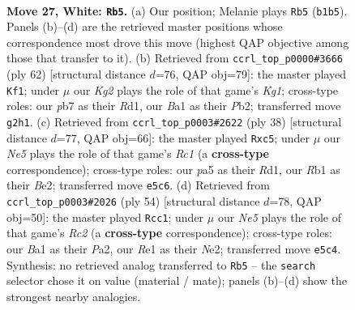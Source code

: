 \documentclass[11pt]{article}
\begin{document}
\clearpage

\begin{figure}[p]\centering
\begin{subfigure}{0.46\textwidth}\centering
\resizebox{\linewidth}{!}{%
\newchessgame
\chessboard[
  setfen={r1b3k1/1p2q2p/4r3/p1nQNpp1/8/4P1P1/P4PKP/BR2R3 w - - 2 27},
  showmover=false,
  pgfstyle=straightmove, color=movearrow, markmove={b1-b5}
]}
\caption{}
\end{subfigure}\hfill
\begin{subfigure}{0.46\textwidth}\centering
\resizebox{\linewidth}{!}{%
\newchessgame
\chessboard[
  setfen={2rr2k1/q4pp1/7p/p1b3n1/P1QN4/2B4P/1P3PP1/R2R2K1 w - - 5 32},
  showmover=false,
  pgfstyle=straightmove, color=movearrow, markmove={g1-f1}
]}
\caption{}
\end{subfigure}
\\[4pt]
\begin{subfigure}{0.46\textwidth}\centering
\resizebox{\linewidth}{!}{%
\newchessgame
\chessboard[
  setfen={r5k1/pb2qpp1/1p2p2p/2r5/3Nn3/Q3P2P/PP2BPP1/2RR2K1 w - - 3 20},
  showmover=false,
  pgfstyle=straightmove, color=movearrow, markmove={c1-c5}
]}
\caption{}
\end{subfigure}\hfill
\begin{subfigure}{0.46\textwidth}\centering
\resizebox{\linewidth}{!}{%
\newchessgame
\chessboard[
  setfen={3r2k1/2q2pp1/pn3b1p/3p4/2r5/1N1QP2P/P1R1NPP1/5RK1 w - - 13 28},
  showmover=false,
  pgfstyle=straightmove, color=movearrow, markmove={c2-c1}
]}
\caption{}
\end{subfigure}
\caption{\textbf{Move 27, White: \texttt{Rb5}.} (a) Our position; Melanie plays \texttt{Rb5} (\texttt{b1b5}). Panels (b)--(d) are the retrieved master positions whose correspondence most drove this move (highest QAP objective among those that transfer to it). (b) Retrieved from \texttt{ccrl\_top\_p0000\#3666} (ply 62) [structural distance $d$=76, QAP obj=79]: the master played \texttt{Kf1}; under $\mu$ our \emph{Kg2} plays the role of that game's \emph{Kg1}; cross-type roles: our \emph{p}b7 as their \emph{R}d1, our \emph{B}a1 as their \emph{P}b2; transferred move \texttt{g2h1}. (c) Retrieved from \texttt{ccrl\_top\_p0003\#2622} (ply 38) [structural distance $d$=77, QAP obj=66]: the master played \texttt{Rxc5}; under $\mu$ our \emph{Ne5} plays the role of that game's \emph{Rc1} (a \textbf{cross-type} correspondence); cross-type roles: our \emph{p}a5 as their \emph{R}d1, our \emph{R}b1 as their \emph{B}e2; transferred move \texttt{e5c6}. (d) Retrieved from \texttt{ccrl\_top\_p0003\#2026} (ply 54) [structural distance $d$=78, QAP obj=50]: the master played \texttt{Rcc1}; under $\mu$ our \emph{Ne5} plays the role of that game's \emph{Rc2} (a \textbf{cross-type} correspondence); cross-type roles: our \emph{B}a1 as their \emph{P}a2, our \emph{R}e1 as their \emph{N}e2; transferred move \texttt{e5c4}. Synthesis: no retrieved analog transferred to \texttt{Rb5} -- the \texttt{search} selector chose it on value (material / mate); panels (b)--(d) show the strongest nearby analogies.}
\label{fig:thought-m52}
\end{figure}
\end{document}
